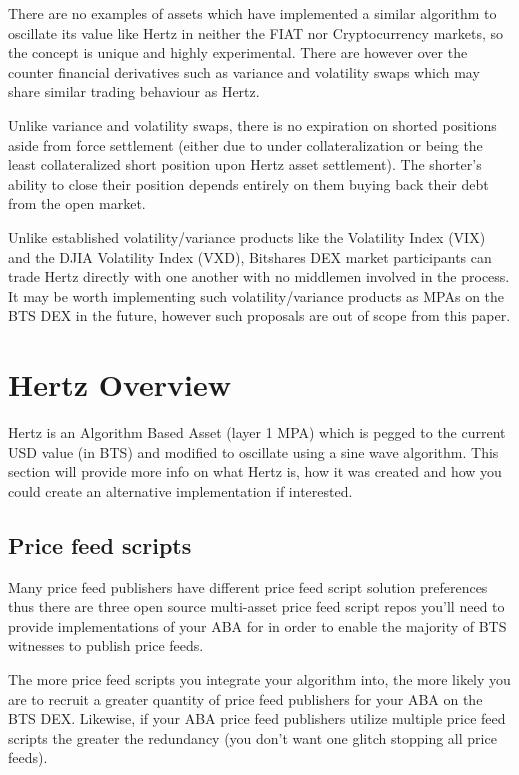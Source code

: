 \documentclass[sigconf]{acmart}
\begin{document}
There are no examples of assets which have implemented a similar algorithm to oscillate its value like Hertz in neither the FIAT nor Cryptocurrency markets, so the concept is unique and highly experimental. There are however over the counter financial derivatives such as variance and volatility swaps which may share similar trading behaviour as Hertz.

Unlike variance and volatility swaps, there is no expiration on shorted positions aside from force settlement (either due to under collateralization or being the least collateralized short position upon Hertz asset settlement). The shorter's ability to close their position depends entirely on them buying back their debt from the open market.

Unlike established volatility/variance products like the Volatility Index (VIX) and the DJIA Volatility Index (VXD), Bitshares DEX market participants can trade Hertz directly with one another with no middlemen involved in the process. It may be worth implementing such volatility/variance products as MPAs on the BTS DEX in the future, however such proposals are out of scope from this paper.

\section{Hertz Overview}

Hertz is an Algorithm Based Asset (layer 1 MPA) which is pegged to the current USD value (in BTS) and modified to oscillate using a sine wave algorithm.\citep{customminer_hertz_2018} This section will provide more info on what Hertz is, how it was created and how you could create an alternative implementation if interested.

\subsection{Price feed scripts}

\noindent Many price feed publishers have different price feed script solution preferences thus there are three open source multi-asset price feed script repos you'll need to provide implementations of your ABA for in order to enable the majority of BTS witnesses to publish price feeds. 

The more price feed scripts you integrate your algorithm into, the more likely you are to recruit a greater quantity of price feed publishers for your ABA on the BTS DEX. Likewise, if your ABA price feed publishers utilize multiple price feed scripts the greater the redundancy (you don't want one glitch stopping all price feeds).
\end{document}
